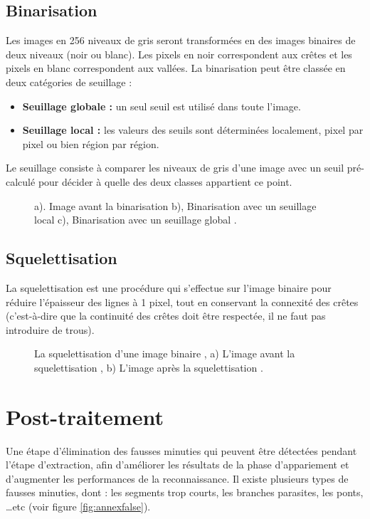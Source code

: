 \subsection{Binarisation}
Les images en 256 niveaux de gris seront transformées en des images binaires de deux niveaux (noir ou blanc). Les pixels en noir correspondent aux crêtes et les pixels en blanc correspondent aux vallées. La binarisation peut être classée en deux catégories de seuillage : 
\begin{itemize}
	\item \textbf{Seuillage globale :} un seul seuil est utilisé dans toute l’image.
    \item \textbf{Seuillage local :} les valeurs des seuils sont déterminées localement, pixel par pixel ou bien région par région. 
    
\end{itemize}
 Le seuillage consiste à comparer les niveaux de gris d'une image avec un seuil pré-calculé pour décider à quelle des deux classes appartient ce point.
\begin{center}
	\begin{figure}[H]
		\centering
				    \captionsetup{justification=centering}
		\caption{a). Image avant la binarisation b), Binarisation avec un seuillage local c), Binarisation avec un seuillage global \citep{saveski2010development}.}
		\label{fig:annexefingerbinar}
	\end{figure}
\end{center}
\subsection{Squelettisation}
La squelettisation est une procédure qui s’effectue sur l’image binaire pour réduire l’épaisseur des lignes à 1 pixel, tout en conservant la connexité des crêtes (c'est-à-dire que la continuité des crêtes doit être respectée, il ne faut pas introduire de trous).
\begin{center}
	\begin{figure}[H]
		\centering
		    \captionsetup{justification=centering}
		\caption{La squelettisation d'une image binaire , a) L’image avant la squelettisation , b) L’image après la squelettisation \citep{maltoni2009handbook}.}
		\label{fig:annexefingersquel}
	\end{figure}
\end{center}
\section{Post-traitement}
\label{posttrait}
Une étape d'élimination des fausses minuties qui peuvent être détectées pendant l'étape d'extraction, afin d'améliorer les résultats de la phase d'appariement et d'augmenter les performances de la reconnaissance. Il existe plusieurs types de fausses minuties, dont : les segments trop courts, les branches parasites, les ponts, …etc (voir figure \ref{fig:annexfalse}).


